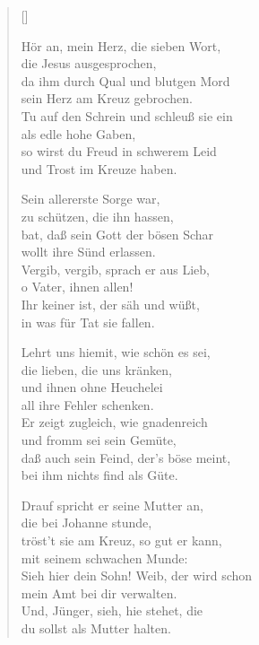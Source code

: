 \begin{multicols}{2}
\settowidth{\versewidth}{Hör an, mein Herz, die sieben Wort}
\begin{verse}[\versewidth]

 Hör an, mein Herz, die sieben Wort,\\
die Jesus ausgesprochen,\\
da ihm durch Qual und blutgen Mord\\
sein Herz am Kreuz gebrochen.\\
Tu auf den Schrein und schleuß sie ein\\
als edle hohe Gaben,\\
so wirst du Freud in schwerem Leid\\
und Trost im Kreuze haben.

 Sein allererste Sorge war,\\
zu schützen, die ihn hassen,\\
bat, daß sein Gott der bösen Schar\\
wollt ihre Sünd erlassen.\\
Vergib, vergib, sprach er aus Lieb,\\
o Vater, ihnen allen!\\
Ihr keiner ist, der säh und wüßt,\\
in was für Tat sie fallen.

 Lehrt uns hiemit, wie schön es sei,\\
die lieben, die uns kränken,\\
und ihnen ohne Heuchelei\\
all ihre Fehler schenken.\\
Er zeigt zugleich, wie gnadenreich\\
und fromm sei sein Gemüte,\\
daß auch sein Feind, der's böse meint,\\
bei ihm nichts find als Güte.

 Drauf spricht er seine Mutter an,\\
die bei Johanne stunde,\\
tröst't sie am Kreuz, so gut er kann,\\
mit seinem schwachen Munde:\\
Sieh hier dein Sohn! Weib, der wird schon\\
mein Amt bei dir verwalten.\\
Und, Jünger, sieh, hie stehet, die\\
du sollst als Mutter halten.


\end{verse}
\end{multicols}
